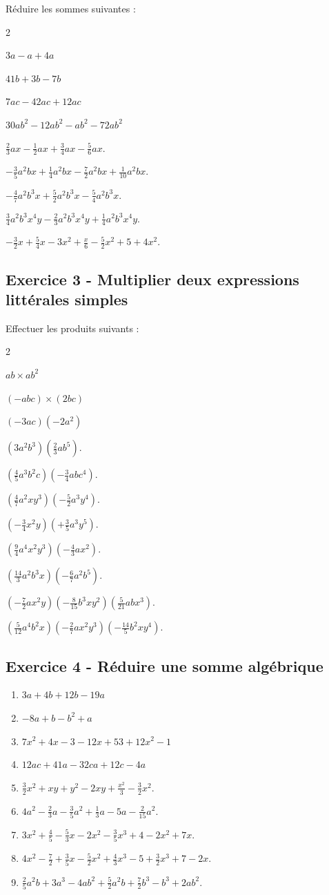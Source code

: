 \documentclass[14 pt]{extarticle}
\renewcommand\it\item
\theoremstyle{plain}
\begin{document}
Réduire les sommes suivantes : 
\begin{enumerate}
  \begin{multicols}{2}
\it $3a-a + 4a$
\it $41b+ 3b - 7b$
\it $7ac - 42ac + 12 ac$
\it $30 ab^2 - 12 ab^2 - ab^2 - 72ab^2$
\it $\frac23ax-\frac12ax+\frac34ax-\frac56ax$.
\it $-\frac35a^2bx+\frac14a^2bx-\frac72a^2bx+\frac1{10}a^2bx$.
\it $-\frac47a^2b^3x+\frac52a^2b^3x-\frac54a^2b^3x$.
\it $\frac34a^2b^3x^4y-\frac23a^2b^3x^4y+\frac14a^2b^3x^4y$. 
\it $-\frac32 x + \frac54 x-3x^2+\frac{x}6-\frac52 x^2+5+4x^2$.
\end{multicols}
\end{enumerate}
  \subsection*{Exercice 3 - Multiplier deux expressions littérales simples}
  Effectuer les produits suivants : 
\begin{enumerate}
  \begin{multicols}{2}
\it $ab \times ab^2$
\it $(-abc) \times (2bc)$
\it $(-3ac)(-2a^2)$
\it $(3a^2b^3)\left(\frac23ab^5\right)$.
\it $\left(\frac45a^3b^2c\right)\left(-\frac34abc^4\right)$. 
\it $\left(\frac47a^2xy^3\right)\left(-\frac52a^3y^4\right)$.
\it $\left(-\frac34x^2y\right)\left(+\frac35a^3y^5\right)$.
\it $\left(\frac94a^4x^2y^3\right)\left(-\frac43ax^2\right)$. 
\it $\left(\frac{14}3a^2b^3x\right)\left(-\frac67a^2b^5\right)$. 
\it $\left(-\frac72ax^2y\right)\left(-\frac8{15}b^3xy^2\right)\left(\frac5{21}abx^3\right)$.
\it $\left(\frac5{12}a^4b^2x\right)\left(-\frac27ax^2y^3\right)\left(-\frac{14}5b^2xy^4\right)$. 
\end{multicols}
\end{enumerate}
  
  \subsection*{Exercice 4 - Réduire une somme algébrique}
  
\begin{enumerate}
\it $3a + 4b + 12b -19a$
\it $-8a + b - b^2 + a$
\it $7x^2 + 4x - 3 - 12x + 53 + 12x^2 - 1$
\it $12ac + 41a - 32 ca + 12 c - 4 a$
\it $\frac32 x^2+xy+y^2-2xy+\frac{x^2}3-\frac32x^2$.
\it $4a^2-\frac23a-\frac35a^2+\frac13a-5a-\frac2{15}a^2$.
\it $3x^2+\frac45 - \frac53x - 2x^2 -\frac35x^3 + 4 - 2 x^2 + 7x$. 
\it $4x^2 - \frac72 + \frac35x - \frac52x^2 + \frac43 x^3 - 5 + \frac32 x^3 + 7 - 2x$. 
\it $\frac25 a^2b + 3a^3 -4ab^2 + \frac52 a^2b + \frac72b^3 - b^3 + 2ab^2$. 
\end{enumerate}
  
\end{document}
